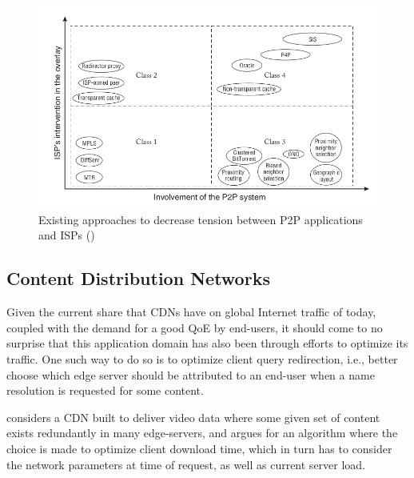     \begin{figure}[!h]
    \centering
    \includegraphics[scale=0.65]{img/approaches-isp-p2p.png}
    \caption{Existing approaches to decrease tension between P2P applications and ISPs (\cite{dan-Commag10})}
    \label{fig:p2p-isp-interactions}
    \end{figure}

\subsection{Content Distribution Networks}

\label{ssec:cdns}

    Given the current share that CDNs have on global Internet traffic of today, coupled with the demand for a good QoE by end-users, it should come to no surprise that this application domain has also been through efforts to optimize its traffic.
    One such way to do so is to optimize client query redirection, i.e., better choose which edge server should be attributed to an end-user when a name resolution is requested for some content.

    \cite{gromov2014} considers a CDN built to deliver video data where some given set of content exists redundantly in many edge-servers, and argues for an algorithm where the choice is made to optimize client download time, which in turn has to consider the network parameters at time of request, as well as current server load.

